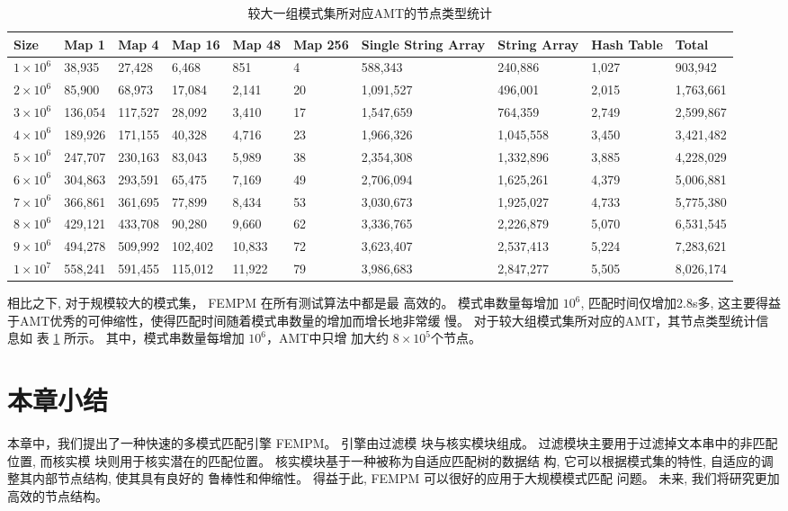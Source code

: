 \begin{table}[!htp]
  \caption{较大一组模式集所对应AMT的节点类型统计}
  \scriptsize
  \label{tab:large_group}
  \begin{tabular}{p{25pt}p{25pt}p{25pt}p{25pt}p{20pt}p{10pt}p{30pt}p{30pt}p{20pt}p{25pt}}
 \hline
 Size &
 Map 1 &
 Map 4 &
 Map 16 &
 Map 48 &
 Map 256 &
 Single String Array &
 String Array   &
 Hash Table &
 Total\\
\hline
$1 \times 10^6$ &  38,935 &   27,428  &   6,468 &     851   &    4 &    588,343  &    240,886 &  1,027 &    903,942  \\
$2 \times 10^6$ &  85,900 &   68,973  &  17,084 &   2,141   &   20 &  1,091,527  &    496,001 &  2,015 &  1,763,661  \\
$3 \times 10^6$ & 136,054 &  117,527  &  28,092 &   3,410   &   17 &  1,547,659  &    764,359 &  2,749 &  2,599,867  \\
$4 \times 10^6$ & 189,926 &  171,155  &  40,328 &   4,716   &   23 &  1,966,326  &  1,045,558 &  3,450 &  3,421,482  \\
$5 \times 10^6$ & 247,707 &  230,163  &  83,043 &   5,989   &  38 &  2,354,308   &  1,332,896 &  3,885 &  4,228,029  \\
$6 \times 10^6$ & 304,863 &  293,591  &  65,475 &   7,169   &   49 &  2,706,094  &  1,625,261 &  4,379 &  5,006,881  \\
$7 \times 10^6$ & 366,861 &  361,695  &  77,899 &   8,434   &   53 &  3,030,673  &  1,925,027 &  4,733 &  5,775,380  \\
$8 \times 10^6$ & 429,121 &  433,708  &  90,280 &   9,660   &   62 &  3,336,765  &  2,226,879 &  5,070 &  6,531,545  \\
$9 \times 10^6$ & 494,278 &  509,992  & 102,402 &  10,833   &   72 &  3,623,407  &  2,537,413 &  5,224 &  7,283,621  \\
$1 \times 10^7$ & 558,241 &  591,455  & 115,012 &  11,922   &   79 &  3,986,683  &  2,847,277 &  5,505 &  8,026,174  \\
\hline
\end{tabular}
\end{table}

相比之下, 对于规模较大的模式集， \textsf{FEMPM} 在所有测试算法中都是最
高效的。 模式串数量每增加 $10^6$, 匹配时间仅增加2.8s多, 这主要得益
于AMT优秀的可伸缩性，使得匹配时间随着模式串数量的增加而增长地非常缓
慢。 对于较大组模式集所对应的AMT，其节点类型统计信息如
表 \ref{tab:large_group} 所示。 其中，模式串数量每增加 $10^6$，AMT中只增
加大约 $8 \times 10^5$个节点。

\section{本章小结}
\label{sec:conclusion}

本章中，我们提出了一种快速的多模式匹配引擎 \textsf{FEMPM}。 引擎由过滤模
块与核实模块组成。 过滤模块主要用于过滤掉文本串中的非匹配位置, 而核实模
块则用于核实潜在的匹配位置。 核实模块基于一种被称为自适应匹配树的数据结
构, 它可以根据模式集的特性, 自适应的调整其内部节点结构, 使其具有良好的
鲁棒性和伸缩性。 得益于此, \textsf{FEMPM} 可以很好的应用于大规模模式匹配
问题。 未来, 我们将研究更加高效的节点结构。
